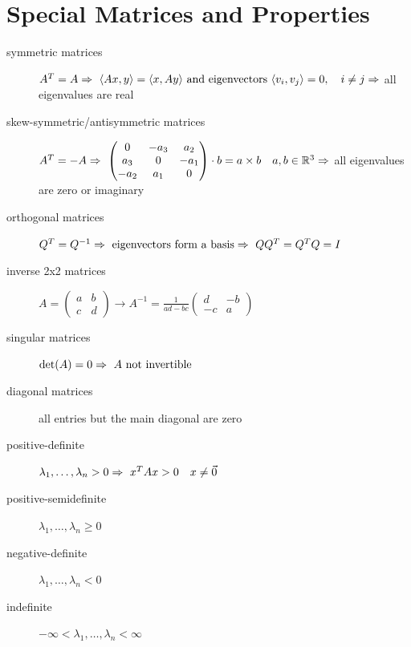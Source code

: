 \documentclass[oneside,fontsize=11pt,paper=a4]{scrartcl}
\begin{document}
\clearpage
\appendix

\section{Special Matrices and Properties}
\begin{description}
     \item[symmetric matrices] $A^T = A \\ \Rightarrow \ \langle Ax, y \rangle =  \langle x, Ay \rangle \text{ and eigenvectors } \langle v_i, v_j \rangle = 0, \quad i \neq j
     \\ \Rightarrow$ all eigenvalues are real
     \item[skew-symmetric/antisymmetric matrices] $A^T = -A \\ \Rightarrow \ \begin{pmatrix}0 & -a_3 & a_2\\ a_3 & 0 & -a_1\\ -a_2 & a_1 & 0\end{pmatrix} \cdot b = a \times b \quad a, b \in \mathbb{R}^3 \\
     \Rightarrow$ all eigenvalues are zero or imaginary
     \item[orthogonal matrices] $Q^T = Q^{-1} \\ \Rightarrow \ \text{eigenvectors form a basis} \\ \Rightarrow \ QQ^T = Q^T Q = I$
     \item[inverse 2x2 matrices] $A = \begin{pmatrix} a & b \\ c & d \end{pmatrix} \rightarrow A^{-1} = \frac{1}{ad-bc} \begin{pmatrix} d & -b \\ -c & a \end{pmatrix}$
     \item[singular matrices] $\det(A) = 0 \\ \Rightarrow \ A \text{ not invertible}$
     \item[diagonal matrices] all entries but the main diagonal are zero   
     \item[positive-definite] $\lambda_1, \dots ,\lambda_n > 0 \\ \Rightarrow \ x^T A x > 0 \quad x \neq \vec{0}$
     \item[positive-semidefinite] $\lambda_1, \dots ,\lambda_n \geq 0$
     \item[negative-definite] $\lambda_1, \dots ,\lambda_n < 0$
     \item[indefinite] $-\infty < \lambda_1, \dots ,\lambda_n < \infty$

\end{description}
\end{document}
